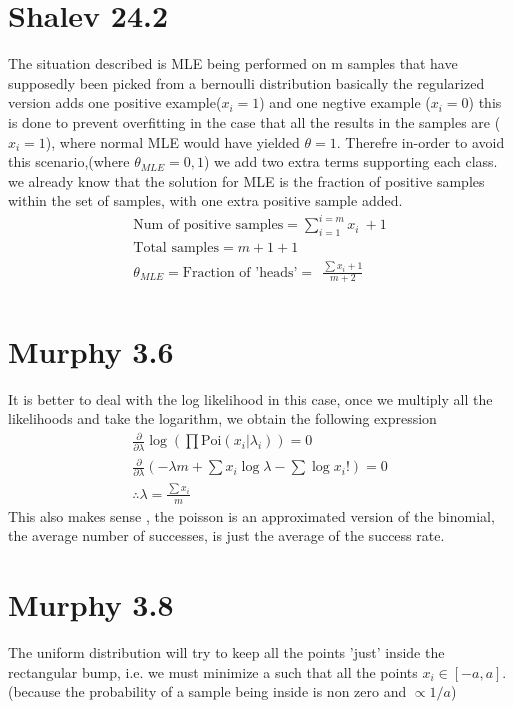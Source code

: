 

% 

\section{Shalev 24.2}
The situation described is MLE being performed on m samples that have supposedly been picked from a bernoulli distribution
basically the regularized version adds one positive example($x_i = 1$) and one negtive example ($x_i = 0$) this is done to prevent overfitting in the case that
all the results in the samples are ($x_i = 1$), where normal MLE would have yielded $\theta = 1$. Therefre in-order to avoid this scenario,(where $\theta_{MLE}  = 0 , 1$)
we add two extra terms supporting each class.
we already know that the solution for MLE is the fraction of positive samples within the set of samples, with one extra positive sample added.
\begin{gather*}
    \text{Num of positive samples} = \sum_{i = 1}^{i = m} x_i  \ +  1 \\
    \text{Total samples} = m + 1 + 1 \\
    \theta_{MLE} = \text{Fraction of 'heads'}   =  \ \ \frac{\sum {x_i} + 1}{m + 2} \\
\end{gather*}


\section{Murphy 3.6}
It is better to deal with the log likelihood in this case, once we multiply all the likelihoods and take the logarithm, we obtain the following expression
\begin{gather}
    \frac{\partial}{\partial \lambda} \log (\prod \text{Poi} (x_i | \lambda_i)) = 0 \\
    \frac{\partial}{\partial \lambda}(-\lambda m + \sum x_i \log \lambda  - \sum \log x_i! ) = 0 \\
    \therefore \lambda = \frac{\sum x_i}{m}
\end{gather}
This also makes sense , the poisson is an approximated version of the binomial, the average number of successes, is just the average of the success rate.


\section{Murphy 3.8}
The uniform distribution will try to keep all the points 'just' inside the rectangular bump, 
i.e. we must minimize a  such that all the points $x_i \in [-a , a]$.(because the probability of a sample being inside is non zero and $\propto 1/a$)

